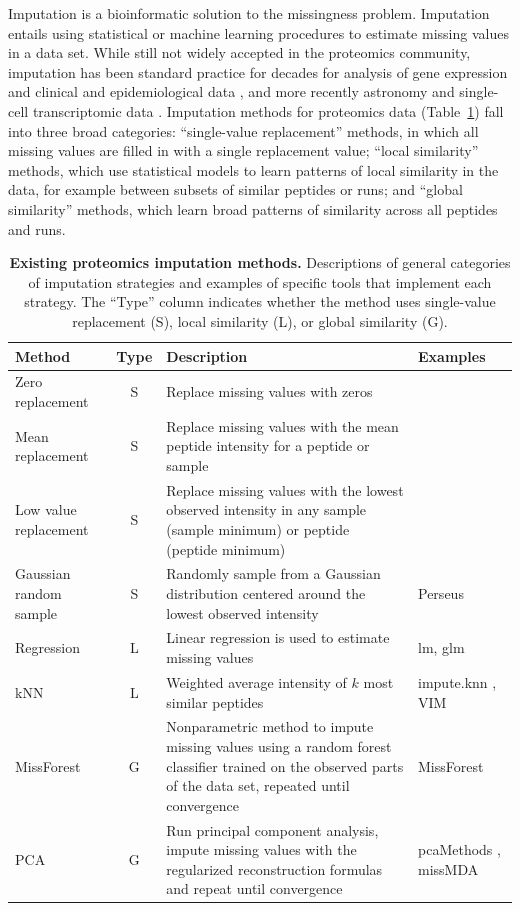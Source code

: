\documentclass{article}
\begin{document}
Imputation is a bioinformatic solution to the missingness problem. Imputation entails using statistical or machine learning procedures to estimate missing values in a data set. While still not widely accepted in the proteomics community, imputation has been standard practice for decades for analysis of gene expression \cite{knn-impute} and clinical and epidemiological data \cite{multi-impute-clinical}, and more recently astronomy \cite{astro-impute1, astro-impute2} and single-cell transcriptomic data \cite{ALRA, magic-scRNA}. Imputation methods for proteomics data (Table~\ref{tab:method-descrip}) fall into three broad categories: ``single-value replacement'' methods, in which all missing values are filled in with a single replacement value; ``local similarity'' methods, which use statistical models to learn patterns of local similarity in the data, for example between subsets of similar peptides or runs; and ``global similarity'' methods, which learn broad patterns of similarity across all peptides and runs.

\begin{table}
  \scriptsize
  \centering
  \begin{tabular}{lcp{3in}p{1in}}
    \hline
    Method & Type & Description & Examples \\
    \hline
    Zero replacement & S & Replace missing values with zeros & \\
    Mean replacement & S & Replace missing values with the mean peptide intensity for a peptide or sample & \\
    Low value replacement & S & Replace missing values with the lowest observed intensity in any sample (sample minimum) or peptide (peptide minimum) & \\
    Gaussian random sample & S & Randomly sample from a Gaussian distribution centered around the lowest observed intensity & Perseus \cite{Perseus} \\
    Regression & L & Linear regression is used to estimate missing values & lm, glm \\
   kNN & L & Weighted average intensity of $k$ most similar peptides & impute.knn \cite{knn-impute}, VIM \cite{VIM} \\
    MissForest & G & Nonparametric method to impute missing values
using a random forest classifier trained on the observed parts of the data set,
repeated until convergence & MissForest \cite{missForest} \\
    PCA & G & Run principal component analysis, impute missing values with the regularized reconstruction formulas and repeat until convergence & pcaMethods \cite{pcaMethods}, missMDA \cite{missMDA} \\
     \hline
  \end{tabular}
  \caption{{\bf Existing proteomics imputation methods.} Descriptions of general categories of imputation strategies and examples of specific tools that implement each strategy.  The ``Type'' column indicates whether the method uses single-value replacement (S), local similarity (L), or global similarity (G).
    \label{tab:method-descrip}}
\end{table}
\end{document}
